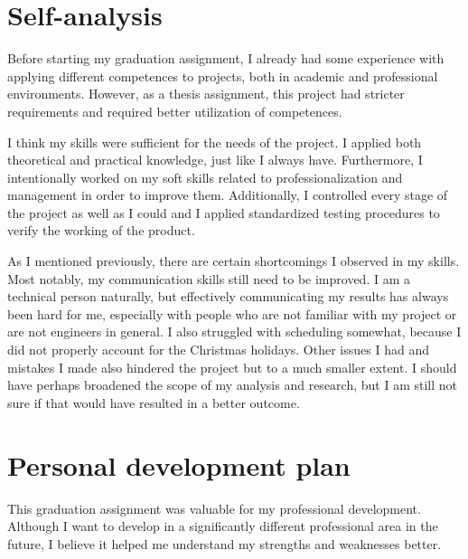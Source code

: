 \documentclass{report}
\begin{document}
\chapter{Self-analysis}

Before starting my graduation assignment, I already had some experience with applying different competences to projects, both in academic and professional environments. However, as a thesis assignment, this project had stricter requirements and required better utilization of competences.

I think my skills were sufficient for the needs of the project. I applied both theoretical and practical knowledge, just like I always have. Furthermore, I intentionally worked on my soft skills related to professionalization and management in order to improve them. Additionally, I controlled every stage of the project as well as I could and I applied standardized testing procedures to verify the working of the product.

As I mentioned previously, there are certain shortcomings I observed in my skills. Most notably, my communication skills still need to be improved. I am a technical person naturally, but effectively communicating my results has always been hard for me, especially with people who are not familiar with my project or are not engineers in general. I also struggled with scheduling somewhat, because I did not properly account for the Christmas holidays. Other issues I had and mistakes I made also hindered the project but to a much smaller extent. I should have perhaps broadened the scope of my analysis and research, but I am still not sure if that would have resulted in a better outcome. 


\chapter{Personal development plan}

This graduation assignment was valuable for my professional development. Although I want to develop in a significantly different professional area in the future, I believe it helped me understand my strengths and weaknesses better. 
\end{document}
